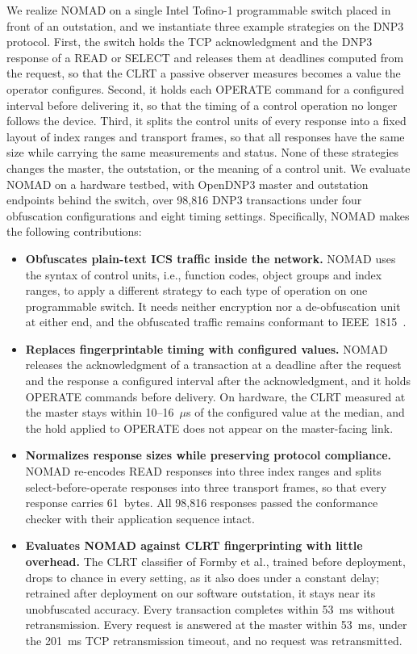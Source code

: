 \documentclass[conference]{IEEEtran}
\begin{document}
We realize NOMAD on a single Intel Tofino-1 programmable switch placed in front of an outstation, and we instantiate three example strategies on the DNP3 protocol. First, the switch holds the TCP acknowledgment and the DNP3 response of a READ or SELECT and releases them at deadlines computed from the request, so that the CLRT a passive observer measures becomes a value the operator configures. Second, it holds each OPERATE command for a configured interval before delivering it, so that the timing of a control operation no longer follows the device. Third, it splits the control units of every response into a fixed layout of index ranges and transport frames, so that all responses have the same size while carrying the same measurements and status. None of these strategies changes the master, the outstation, or the meaning of a control unit. We evaluate NOMAD on a hardware testbed, with OpenDNP3 master and outstation endpoints behind the switch, over 98,816 DNP3 transactions under four obfuscation configurations and eight timing settings. Specifically, NOMAD makes the following contributions:

\begin{itemize}[leftmargin=*,labelindent=0pt,topsep=2pt,itemsep=2pt,parsep=0pt]
\item \textbf{Obfuscates plain-text ICS traffic inside the network.} NOMAD uses the syntax of control units, i.e., function codes, object groups and index ranges, to apply a different strategy to each type of operation on one programmable switch. It needs neither encryption nor a de-obfuscation unit at either end, and the obfuscated traffic remains conformant to IEEE~1815~\cite{dnp3std}.
\item \textbf{Replaces fingerprintable timing with configured values.} NOMAD releases the acknowledgment of a transaction at a deadline after the request and the response a configured interval after the acknowledgment, and it holds OPERATE commands before delivery. On hardware, the CLRT measured at the master stays within 10--16~$\mu$s of the configured value at the median, and the hold applied to OPERATE does not appear on the master-facing link.
\item \textbf{Normalizes response sizes while preserving protocol compliance.} NOMAD re-encodes READ responses into three index ranges and splits select-before-operate responses into three transport frames, so that every response carries 61~bytes. All 98,816 responses passed the conformance checker with their application sequence intact.
\item \textbf{Evaluates NOMAD against CLRT fingerprinting with little overhead.} The CLRT classifier of Formby et al., trained before deployment, drops to chance in every setting, as it also does under a constant delay; retrained after deployment on our software outstation, it stays near its unobfuscated accuracy. Every transaction completes within 53~ms without retransmission. Every request is answered at the master within 53~ms, under the 201~ms TCP retransmission timeout, and no request was retransmitted.
\end{itemize}
\end{document}
